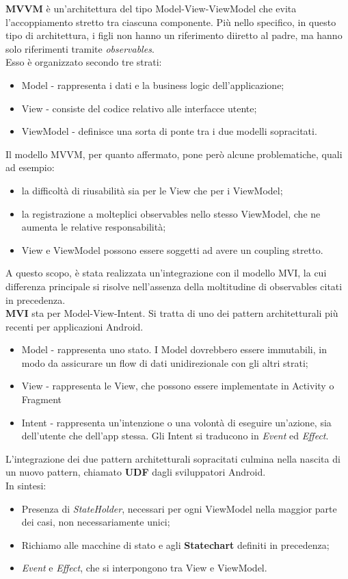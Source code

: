 \documentclass{natourDoc}
\begin{document}
\textbf{MVVM} è un'architettura del tipo Model-View-ViewModel che evita l'accoppiamento stretto
tra ciascuna componente. Più nello specifico, in questo tipo di architettura, i figli non hanno un
riferimento diiretto al padre, ma hanno solo riferimenti tramite \textit{observables}.\\
Esso è organizzato secondo tre strati:
\begin{itemize}
	\item Model - rappresenta i dati e la business logic dell'applicazione;
	\item View - consiste del codice relativo alle interfacce utente;
	\item ViewModel - definisce una sorta di ponte tra i due modelli sopracitati.
\end{itemize}

Il modello MVVM, per quanto affermato, pone però alcune problematiche, quali ad esempio:
\begin{itemize}
	\item la difficoltà di riusabilità sia per le View che per i ViewModel;
	\item la registrazione a molteplici observables nello stesso ViewModel, che ne aumenta le relative responsabilità;
	\item View e ViewModel possono essere soggetti ad avere un coupling stretto.
\end{itemize}

A questo scopo, è stata realizzata un'integrazione con il modello MVI, la cui differenza principale si risolve nell'assenza
della moltitudine di observables citati in precedenza. \\

\textbf{MVI} sta per Model-View-Intent. Si tratta di uno dei pattern architetturali più recenti per applicazioni Android.
\begin{itemize}
	\item Model - rappresenta uno stato. I Model dovrebbero essere immutabili, in modo da
	      assicurare un flow di dati unidirezionale con gli altri strati;
	\item View - rappresenta le View, che possono essere implementate in Activity o Fragment
	\item Intent - rappresenta un'intenzione o una volontà di eseguire un'azione, sia dell'utente
	      che dell'app stessa. Gli Intent si traducono in \textit{Event} ed \textit{Effect}.
\end{itemize}

L'integrazione dei due pattern architetturali sopracitati culmina nella nascita di un nuovo pattern, chiamato \textbf{UDF} dagli sviluppatori Android.\\
In sintesi:
\begin{itemize}
	\item Presenza di \textit{StateHolder}, necessari per ogni ViewModel nella maggior parte dei casi, non necessariamente unici;
	\item Richiamo alle macchine di stato e agli \textbf{Statechart} definiti in precedenza;
	\item \textit{Event} e \textit{Effect}, che si interpongono tra View e ViewModel.
\end{itemize} 
\end{document}
